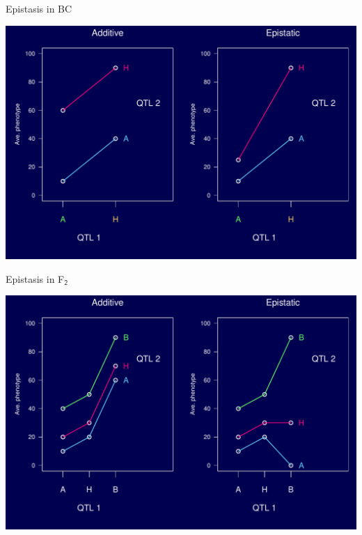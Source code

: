 \documentclass[12pt]{article}
\newcommand{\headsize}{\fontsize{35}{35} \selectfont}
\begin{document}
\newpage

\headsize \color{myyellow}
\hfill \begin{minipage}{5.75in}
\centering
Epistasis in BC
\end{minipage}

\vfill

\centerline{\includegraphics{FigsB/epistasis_bc.pdf}}


\newpage

\headsize \color{myyellow}
\hfill \begin{minipage}{5.75in}
\centering
Epistasis in F$_{\mathsf{2}}$
\end{minipage}

\vfill

\centerline{\includegraphics{FigsB/epistasis_f2.pdf}}



\newpage
\end{document}

